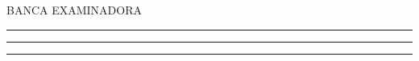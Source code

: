 \begin{titlepage}
    \MakeUppercase{Banca examinadora} \par
    \vspace{1cm}
    \rule{8cm}{0.4pt} \par
    \membroa \par
    \vspace{0.8cm}

    \rule{8cm}{0.4pt} \par
    \membrob \par
    \vspace{0.8cm}

    \rule{8cm}{0.4pt} \par
    \membroc \par
    \vspace{0.8cm}


\end{titlepage}